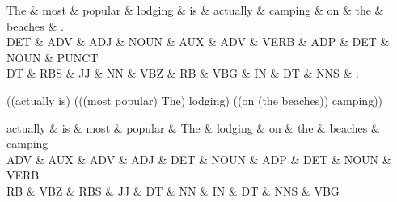 
\begin{figure*}

\begin{dependency}
\begin{deptext}
The \& most \& popular \& lodging \& is \& actually \& camping \& on \& the \& beaches \& . \\
DET \& ADV \& ADJ \& NOUN \& AUX \& ADV \& VERB \& ADP \& DET \& NOUN \& PUNCT \\
DT \& RBS \& JJ \& NN \& VBZ \& RB \& VBG \& IN \& DT \& NNS \& . \\
\end{deptext}



\end{dependency}

((actually is) (((most popular) The) lodging) ((on (the beaches)) camping))

\begin{dependency}
\begin{deptext}
actually \& is \& most \& popular \& The \& lodging \& on \& the \& beaches \& camping \\
ADV \& AUX \& ADV \& ADJ \& DET \& NOUN \& ADP \& DET \& NOUN \& VERB \\
RB \& VBZ \& RBS \& JJ \& DT \& NN \& IN \& DT \& NNS \& VBG \\
\end{deptext}



\end{dependency}

\end{figure*}

